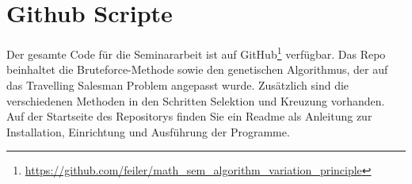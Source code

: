 %
%
%
%
\section{Github Scripte
\label{buch:paper:varalg:section:github_scripte}}

Der gesamte Code für die Seminararbeit ist auf GitHub\footnote{
    \url{https://github.com/feiler/math_sem_algorithm_variation_principle}
    }
\cite{varalg:repo} verfügbar. Das Repo beinhaltet die Bruteforce-Methode sowie
den genetischen Algorithmus, der auf das Travelling Salesman Problem angepasst wurde. Zusätzlich
sind die verschiedenen Methoden in den Schritten Selektion und Kreuzung vorhanden.
Auf der Startseite des Repositorys finden Sie ein Readme als Anleitung zur 
Installation, Einrichtung und Ausführung der Programme.
